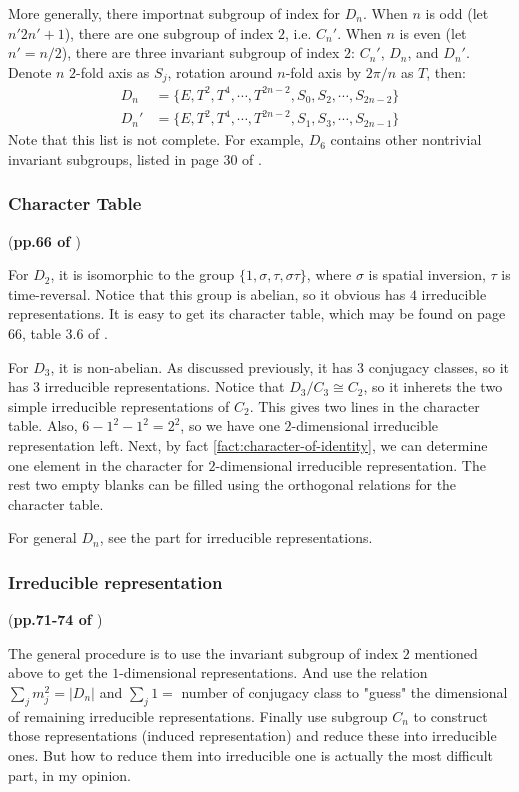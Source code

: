 More generally, there importnat subgroup of index for $D_n$. When $n$
is odd (let $n'2n'+1$), there are one subgroup of index $2$, i.e.
$C_n'$. When $n$ is even (let $n'=n/2$), there are three invariant
subgroup of index $2$: $C_n'$, $D_n$, and $D_n'$. Denote $n$ $2$-fold
axis as $S_j$, rotation around $n$-fold axis by $2\pi/n$ as $T$,
then:
\begin{align}
    D_n &= \{E, T^2,T^4,\cdots,T^{2n-2},S_0,S_2,\cdots,S_{2n-2}\} \\
    D_n' &= \{E, T^2,T^4,\cdots,T^{2n-2},S_1,S_3,\cdots,S_{2n-1}\}
\end{align}
Note that this list is not complete. For example, $D_6$ contains other
nontrivial invariant subgroups, listed in page 30 of \cite{book}.

\subsubsection{Character Table} (\textbf{pp.66 of \cite{book}})

For $D_2$, it is isomorphic to the group
$\{1,\sigma,\tau,\sigma\tau\}$, where $\sigma$ is spatial inversion,
$\tau$ is time-reversal. Notice that this group is abelian, so it
obvious has $4$ irreducible representations. It is easy to get its
character table, which may be found on page 66, table 3.6 of
\cite{book}.

For $D_3$, it is non-abelian. As discussed previously, it has $3$
conjugacy classes, so it has 3 irreducible representations. Notice
that $D_3/C_3 \cong C_2$, so it inherets the two simple irreducible
representations of $C_2$. This gives two lines in the character
table. Also, $6-1^2-1^2=2^2$, so we have one $2$-dimensional
irreducible representation left.  Next, by fact
\ref{fact:character-of-identity}, we can determine one element in the
character for $2$-dimensional irreducible representation. The rest two
empty blanks can be filled using the orthogonal relations for the
character table.

For general $D_n$, see the part for irreducible representations.

\subsubsection{Irreducible representation} 

(\textbf{pp.71-74 of \cite{book}}) 

The general procedure is to use the invariant subgroup of index $2$
mentioned above to get the $1$-dimensional representations. And use
the relation $\sum_j m_j^2 = |D_n|$ and $\sum_j 1 = $ number of
conjugacy class to "guess" the dimensional of remaining irreducible
representations. Finally use subgroup $C_n$ to construct those
representations (induced representation) and reduce these into
irreducible ones. But how to reduce them into irreducible one is
actually the most difficult part, in my opinion.

